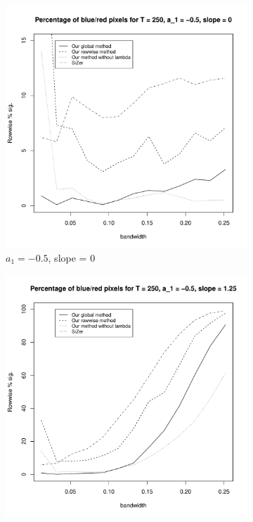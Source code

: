\documentclass[a4paper,12pt]{article}
\begin{document}
\begin{figure}[t!]
\begin{subfigure}[b]{0.475\textwidth}
\includegraphics[width=\textwidth]{Plots/rowwise_sig_comparison_T_250_a1_-50_slope_0.pdf}
\caption{$a_1 = -0.5$, slope = $0$}
\end{subfigure}\hspace{0.25cm}
\begin{subfigure}[b]{0.475\textwidth}
\includegraphics[width=\textwidth]{Plots/rowwise_sig_comparison_T_250_a1_-50_slope_125.pdf}

\end{subfigure}
\end{figure}
\end{document}

